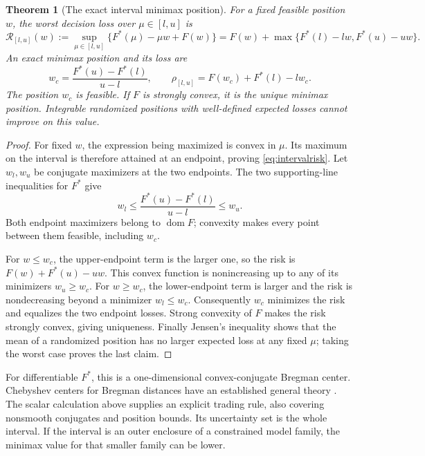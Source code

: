 \documentclass[11pt]{article}
\theoremstyle{plain}
\newtheorem{theorem}{Theorem}[section]
\theoremstyle{definition}
\theoremstyle{remark}
\begin{document}
\begin{theorem}[The exact interval minimax position]
\label{thm:intervalposition}
For a fixed feasible position \(w\), the worst decision loss over
\(\mu\in[l,u]\) is
\begin{equation}\label{eq:intervalrisk}
 \mathcal R_{[l,u]}(w)
 :=\sup_{\mu\in[l,u]}\{F^*(\mu)-\mu w+F(w)\}
 =F(w)+\max\{F^*(l)-lw,F^*(u)-uw\}.
\end{equation}
An exact minimax position and its loss are
\begin{equation}\label{eq:secantposition}
 w_c=\frac{F^*(u)-F^*(l)}{u-l},\qquad
 \rho_{[l,u]}=F(w_c)+F^*(l)-lw_c .
\end{equation}
The position \(w_c\) is feasible. If \(F\) is strongly convex,
it is the unique minimax position. Integrable randomized positions
with well-defined expected losses cannot improve on this value.
\end{theorem}
\begin{proof}
For fixed \(w\), the expression being maximized is convex in
\(\mu\). Its maximum on the interval is therefore attained at
an endpoint, proving \eqref{eq:intervalrisk}.
Let \(w_l,w_u\) be conjugate maximizers at the two endpoints.
The two supporting-line inequalities for \(F^*\) give
\[
 w_l\le\frac{F^*(u)-F^*(l)}{u-l}\le w_u .
\]
Both endpoint maximizers belong to \(\operatorname{dom}F\);
convexity makes every point between them feasible, including
\(w_c\).

For \(w\le w_c\), the upper-endpoint term is the larger one, so
the risk is \(F(w)+F^*(u)-uw\). This convex function is
nonincreasing up to any of its minimizers \(w_u\ge w_c\).
For \(w\ge w_c\), the lower-endpoint term is larger and the
risk is nondecreasing beyond a minimizer \(w_l\le w_c\).
Consequently \(w_c\) minimizes the risk and equalizes the two
endpoint losses. Strong convexity of \(F\) makes the risk strongly
convex, giving uniqueness. Finally Jensen's inequality shows that
the mean of a randomized position has no larger expected loss
at any fixed \(\mu\); taking the worst case proves the last claim.
\end{proof}

For differentiable \(F^*\), this is a one-dimensional
convex-conjugate Bregman center. Chebyshev centers for Bregman
distances have an established general theory
\citep{BauschkeEtAl2010}. The scalar calculation above supplies
an explicit trading rule, also covering nonsmooth conjugates and
position bounds. Its uncertainty set is the whole interval.
If the interval is an outer enclosure of a constrained model
family, the minimax value for that smaller family can be lower.
\end{document}
